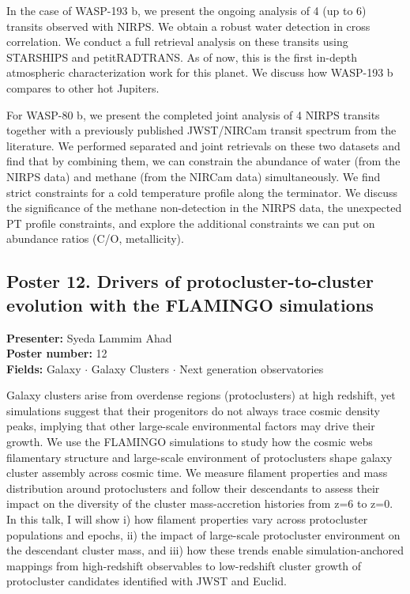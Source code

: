 In the case of WASP-193 b, we present the ongoing analysis of 4 (up to 6) transits observed with NIRPS. We obtain a robust water detection in cross correlation. We conduct a full retrieval analysis on these transits using STARSHIPS and petitRADTRANS. As of now, this is the first in-depth atmospheric characterization work for this planet. We discuss how WASP-193 b compares to other hot Jupiters.

For WASP-80 b, we present the completed joint analysis of 4 NIRPS transits together with a previously published JWST/NIRCam transit spectrum from the literature. We performed separated and joint retrievals on these two datasets and find that by combining them, we can constrain the abundance of water (from the NIRPS data) and methane (from the NIRCam data) simultaneously. We find strict constraints for a cold temperature profile along the terminator. We discuss the significance of the methane non-detection in the NIRPS data, the unexpected PT profile constraints, and explore the additional constraints we can put on abundance ratios (C/O, metallicity).

\hypertarget{poster-abstract-talk-152}{}\label{poster-abstract-page-talk-152}
\subsection*{Poster 12. Drivers of protocluster-to-cluster evolution with the FLAMINGO simulations}
\textbf{Presenter:} Syeda Lammim Ahad\\
\textbf{Poster number:} 12\\
\textbf{Fields:} Galaxy $\cdot$ Galaxy Clusters $\cdot$ Next generation observatories

Galaxy clusters arise from overdense regions (protoclusters) at high redshift, yet simulations suggest that their progenitors do not always trace cosmic density peaks, implying that other large-scale environmental factors may drive their growth. We use the FLAMINGO simulations to study how the cosmic webs filamentary structure and large-scale environment of protoclusters shape galaxy cluster assembly across cosmic time. We measure filament properties and mass distribution around protoclusters and follow their descendants to assess their impact on the diversity of the cluster mass-accretion histories from z=6 to z=0. In this talk, I will show i) how filament properties vary across protocluster populations and epochs, ii) the impact of large-scale protocluster environment on the descendant cluster mass, and iii) how these trends enable simulation-anchored mappings from high-redshift observables to low-redshift cluster growth of protocluster candidates identified with JWST and Euclid.

